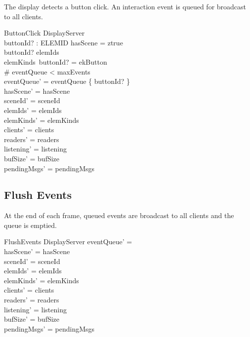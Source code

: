 \documentclass[a4paper,10pt,fleqn]{article}
\begin{document}
The display detects a button click.  An interaction event is queued
for broadcast to all clients.

\begin{schema}{ButtonClick}
  \Delta DisplayServer \\
  buttonId? : ELEMID
  \where
  hasScene = ztrue \\
  buttonId? \in elemIds \\
  elemKinds~buttonId? = ekButton \\
  \# eventQueue < maxEvents \\
  eventQueue' = eventQueue \cup \{ buttonId? \} \\
  hasScene' = hasScene \\
  sceneId' = sceneId \\
  elemIds' = elemIds \\
  elemKinds' = elemKinds \\
  clients' = clients \\
  readers' = readers \\
  listening' = listening \\
  bufSize' = bufSize \\
  pendingMsgs' = pendingMsgs
\end{schema}

\subsection{Flush Events}

At the end of each frame, queued events are broadcast to all
clients and the queue is emptied.

\begin{schema}{FlushEvents}
  \Delta DisplayServer
  \where
  eventQueue' = \emptyset \\
  hasScene' = hasScene \\
  sceneId' = sceneId \\
  elemIds' = elemIds \\
  elemKinds' = elemKinds \\
  clients' = clients \\
  readers' = readers \\
  listening' = listening \\
  bufSize' = bufSize \\
  pendingMsgs' = pendingMsgs
\end{schema}
\end{document}
